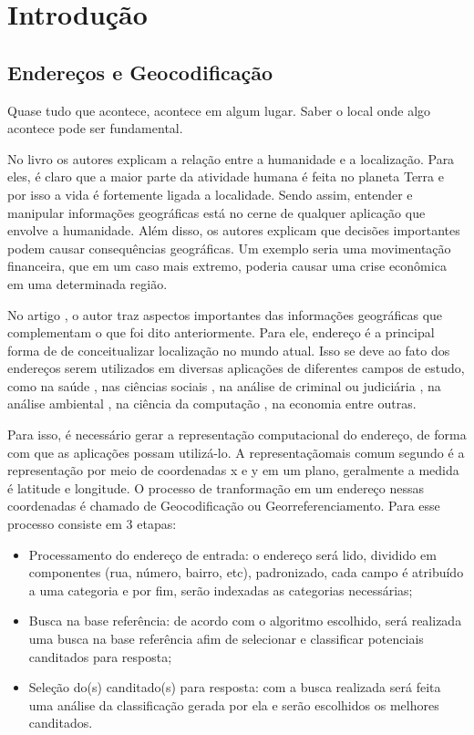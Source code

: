 \chapter{Introdução} \label{Introducao}

\section{Endereços e Geocodificação}

\epigraph{Quase tudo que acontece, acontece em algum lugar. Saber o local onde algo acontece pode ser fundamental.}{\cite{longley2013}}

No livro \cite{longley2013} os autores explicam a relação entre a humanidade e a localização. Para eles, é claro que a maior parte da atividade humana é feita no planeta Terra e por isso a vida é fortemente ligada a localidade. Sendo assim, entender e manipular informações geográficas está no cerne de qualquer aplicação que envolve a humanidade. Além disso, os autores explicam que decisões importantes podem causar consequências geográficas. Um exemplo seria uma movimentação financeira, que em um caso mais extremo, poderia causar uma crise econômica em uma determinada região.

No artigo \cite{Zamberg2009}, o autor traz aspectos importantes das informações geográficas que complementam o que foi dito anteriormente. Para ele, endereço é a principal forma de de conceitualizar localização no mundo atual. Isso se deve ao fato dos endereços serem utilizados em diversas aplicações de diferentes campos de estudo, como na saúde \cite{AmericaJournal2001,Kypri2009,Mazumdar2008}, nas ciências sociais \cite{Chow2011}, na análise de criminal ou judiciária \cite{Olligschlaeger1998}, na análise ambiental \cite{Gilboa2006}, na ciência da computação \cite{Zamberg2009}, na economia \cite{Whitsel2006} entre outras.

Para isso, é necessário gerar a representação computacional do endereço, de forma com que as aplicações possam utilizá-lo. A representaçãomais comum segundo \cite{Zamberg2009} é a representação por meio de coordenadas x e y em um plano, geralmente a medida é latitude e longitude. O processo de tranformação em um endereço nessas coordenadas é chamado de Geocodificação ou Georreferenciamento. Para \cite{Zamberg2009} esse processo consiste em 3 etapas:
\begin{itemize}
   \item Processamento do endereço de entrada: o endereço será lido, dividido em componentes (rua, número, bairro, etc), padronizado, cada campo é atribuído a uma categoria e por fim, serão indexadas as categorias necessárias; 
   \item Busca na base referência: de acordo com o algoritmo escolhido, será realizada uma busca na base referência afim de selecionar e classificar potenciais canditados para resposta;
   \item Seleção do(s) canditado(s) para resposta: com a busca realizada será feita uma análise da classificação gerada por ela e serão escolhidos os melhores canditados.
\end{itemize}

